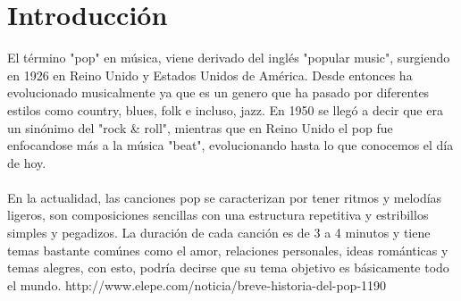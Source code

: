 \section{Introducción}
  El término "pop" en música, viene derivado del inglés "popular music",
  surgiendo en 1926 en Reino Unido y Estados Unidos de América. Desde entonces ha evolucionado
  musicalmente ya que es un genero que ha pasado por diferentes estilos como country, blues, folk
  e incluso, jazz. En 1950 se llegó a decir que era un sinónimo del "rock & roll", mientras que en
  Reino Unido el pop fue enfocandose más a la música "beat", evolucionando hasta lo que conocemos
  el día de hoy.\\\\
  En la actualidad, las canciones pop se caracterizan por tener ritmos y melodías ligeros,
  son composiciones sencillas con una estructura repetitiva y estribillos simples y pegadizos.
  La duración de cada canción es de 3 a 4 minutos y tiene temas bastante comúnes como el amor,
  relaciones personales, ideas románticas y temas alegres, con esto, podría decirse
  que su tema objetivo es básicamente todo el mundo. http://www.elepe.com/noticia/breve-historia-del-pop-1190

